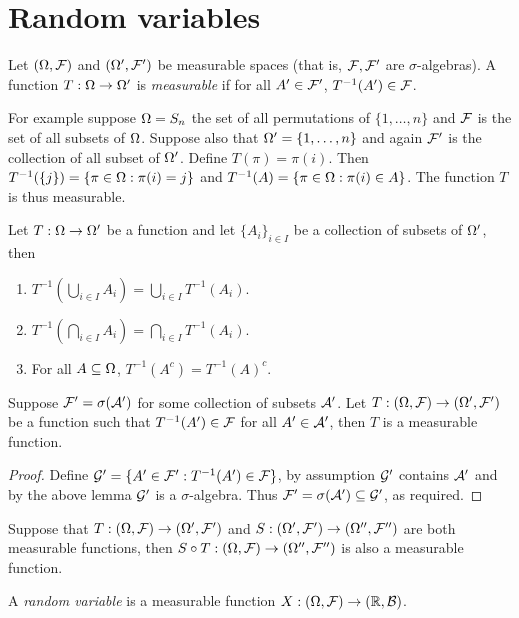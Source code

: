 \section{Random variables}
\begin{defn}
    Let $({{\Omega}}, {\mathcal{F}})$ and $({{\Omega}}',{\mathcal{F}}')$ be measurable spaces (that is, ${\mathcal{F}},{\mathcal{F}}'$ are $\sigma$-algebras). A function $T: {{\Omega}} \to {{\Omega}}'$ is \emph{measurable} if for all $A' \in {\mathcal{F}}'$, $T^{-1}(A') \in {\mathcal{F}}$.
\end{defn}
For example suppose ${{\Omega}}=S_n$ the set of all permutations of $\{1,\ldots, n\}$ and ${\mathcal{F}}$ is the set of all subsets of ${{\Omega}}$. Suppose also that ${{\Omega}}'  = \{1,\ldots, n\}$ and again ${\mathcal{F}}'$ is the collection of all subset of ${{\Omega}}'$. Define $T(\pi) = \pi(i)$. Then $T^{-1}(\{j\}) = \{\pi \in {{\Omega}} : \pi(i) = j\}$ and $T^{-1}(A) = \{ \pi \in {{\Omega}} : \pi(i) \in A\}$. The function $T$ is thus measurable.
\begin{lemma}
    Let $T : {{\Omega}} \to {{\Omega}}'$ be a function and let $\{A_i\}_{i\in I}$ be a collection of subsets of ${{\Omega}}'$, then
    \begin{enumerate}
        \item $T^{-1}\left(\bigcup_{i \in I} A_i\right) = \bigcup_{i\in I} T^{-1}(A_i)$.
        \item $T^{-1}\left(\bigcap_{i \in I} A_i\right) = \bigcap_{i\in I} T^{-1}(A_i)$.
        \item For all $A \subseteq {{\Omega}}$, $T^{-1}(A^c) = T^{-1}(A)^c$.
    \end{enumerate}
\end{lemma}
\begin{prop}
    Suppose ${\mathcal{F}}' = \sigma({\mathcal{A}}')$ for some collection of subsets ${\mathcal{A}}'$. Let $T: ({{\Omega}},{\mathcal{F}}) \to ({{\Omega}}',{\mathcal{F}}')$ be a function such that $T^{-1}(A') \in {\mathcal{F}}$ for all $A' \in {\mathcal{A}}'$, then $T$ is a measurable function.
\end{prop}
\begin{proof}
    Define ${\mathcal{G}}' = \{A' \in {\mathcal{F}}' : T^{-1}(A') \in {\mathcal{F}}\}$, by assumption ${\mathcal{G}}'$ contains ${\mathcal{A}}'$ and by the above lemma ${\mathcal{G}}'$ is a $\sigma$-algebra. Thus ${\mathcal{F}}' = \sigma({\mathcal{A}}') \subseteq {\mathcal{G}}'$, as required.
\end{proof}
\begin{prop}
    Suppose that $T:({{\Omega}},{\mathcal{F}}) \to ({{\Omega}}',{\mathcal{F}}')$ and $S:({{\Omega}}',{\mathcal{F}}') \to ({{\Omega}}'', {\mathcal{F}}'')$ are both measurable functions, then $S \circ T:({{\Omega}}, {\mathcal{F}}) \to ({{\Omega}}'',{\mathcal{F}}'')$ is also a measurable function.
\end{prop}
\begin{defn}
    A \emph{random variable} is a measurable function $X : ({{\Omega}}, {\mathcal{F}}) \to ({\mathbb R}, {\mathcal{B}})$.
\end{defn}
